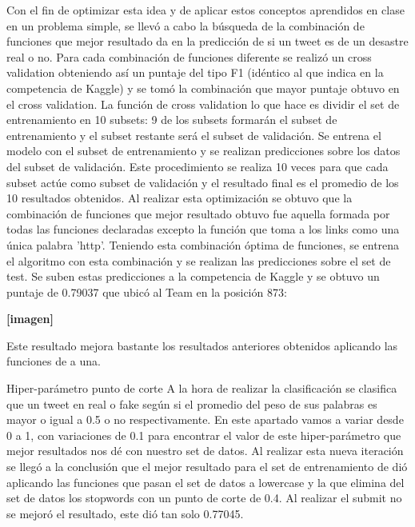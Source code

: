 \documentclass[12pt]{article}
\begin{document}
Con el fin de optimizar esta idea y de aplicar estos conceptos aprendidos en clase en un problema simple, se llevó a cabo la búsqueda de la combinación de funciones que mejor resultado da en la predicción de si un tweet es de un desastre real o no.
Para cada combinación de funciones diferente se realizó un cross validation obteniendo así un puntaje del tipo F1 (idéntico al que indica en la competencia de Kaggle) y se tomó la combinación que mayor puntaje obtuvo en el cross validation.
La función de cross validation lo que hace es dividir el set de entrenamiento en 10 subsets: 9 de los subsets formarán el subset de entrenamiento y el subset restante será el subset de validación.
Se entrena el modelo con el subset de entrenamiento y se realizan predicciones sobre los datos del subset de validación. Este procedimiento se realiza 10 veces para que cada subset actúe como subset de validación y el resultado final es el promedio de los 10 resultados obtenidos.
Al realizar esta optimización se obtuvo que la combinación de funciones que mejor resultado obtuvo fue aquella formada por todas las funciones declaradas excepto la función que toma a los links como una única palabra 'http'.
Teniendo esta combinación óptima de funciones, se entrena el algoritmo con esta combinación y se realizan las predicciones sobre el set de test. Se suben estas predicciones a la competencia de Kaggle y se obtuvo un puntaje de 0.79037 que ubicó al Team en la posición 873:

\textbf{[imagen]\\}


Este resultado mejora bastante los resultados anteriores obtenidos aplicando las funciones de a una.

Hiper-parámetro punto de corte
A la hora de realizar la clasificación se clasifica que un tweet en real o fake según si el promedio del peso de sus palabras es mayor o igual a 0.5 o no respectivamente.
En este apartado vamos a variar desde 0 a 1, con variaciones de 0.1 para encontrar el valor de este hiper-parámetro que mejor resultados nos dé con nuestro set de datos.
Al realizar esta nueva iteración se llegó a la conclusión que el mejor resultado para el set de entrenamiento de dió aplicando las funciones que pasan el set de datos a lowercase y la que elimina del set de datos los stopwords con un punto de corte de 0.4. Al realizar el submit no se mejoró el resultado, este dió tan solo 0.77045.


\newpage
\end{document}
